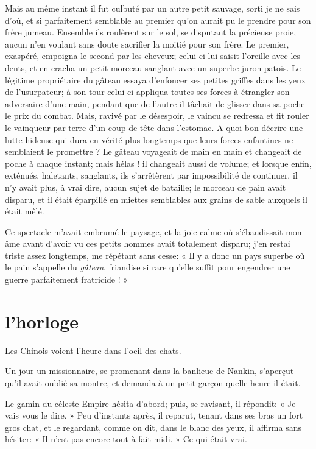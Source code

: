 Mais au même instant il fut culbuté par un autre petit sauvage, sorti je
ne sais d’où, et si parfaitement semblable au premier
qu’on aurait pu le prendre pour son frère jumeau.
Ensemble ils roulèrent sur le sol, se disputant la précieuse proie,
aucun n’en voulant sans doute sacrifier la moitié pour
son frère. Le premier, exaspéré, empoigna le second par les cheveux;
celui{}-ci lui saisit l’oreille avec les dents, et en
cracha un petit morceau sanglant avec un superbe juron patois. Le
légitime propriétaire du gâteau essaya d’enfoncer ses
petites griffes dans les yeux de l’usurpateur; à son
tour celui{}-ci appliqua toutes ses forces à étrangler son adversaire
d’une main, pendant que de l’autre il
tâchait de glisser dans sa poche le prix du combat. Mais, ravivé par le
désespoir, le vaincu se redressa et fit rouler le vainqueur par terre
d’un coup de tête dans l’estomac. A
quoi bon décrire une lutte hideuse qui dura en vérité plus longtemps
que leurs forces enfantines ne semblaient le promettre ? Le gâteau
voyageait de main en main et changeait de poche à chaque instant; mais
hélas ! il changeait aussi de volume; et lorsque enfin, exténués,
haletants, sanglants, ils s’arrêtèrent par
impossibilité de continuer, il n’y avait plus, à vrai
dire, aucun sujet de bataille; le morceau de pain avait disparu, et il
était éparpillé en miettes semblables aux grains de sable auxquels il
était mêlé.

Ce spectacle m’avait embrumé le paysage, et la joie
calme où s’ébaudissait mon âme avant
d’avoir vu ces petits hommes avait totalement disparu;
j’en restai triste assez longtemps, me répétant sans
cesse: « Il y a donc un pays superbe où le pain
s’appelle du \textit{gâteau}, friandise si rare
qu’elle suffit pour engendrer une guerre parfaitement
fratricide ! »

\quebra\section[L’horloge]{l’horloge}

Les Chinois voient l’heure dans l’oeil
des chats.

Un jour un missionnaire, se promenant dans la banlieue de Nankin,
s’aperçut qu’il avait oublié sa
montre, et demanda à un petit garçon quelle heure il était.

Le gamin du céleste Empire hésita d’abord; puis, se
ravisant, il répondit: « Je vais vous le dire. » Peu
d’instants après, il reparut, tenant dans ses bras un
fort gros chat, et le regardant, comme on dit, dans le blanc des yeux,
il affirma sans hésiter: « Il n’est pas encore tout à
fait midi. » Ce qui était vrai.

